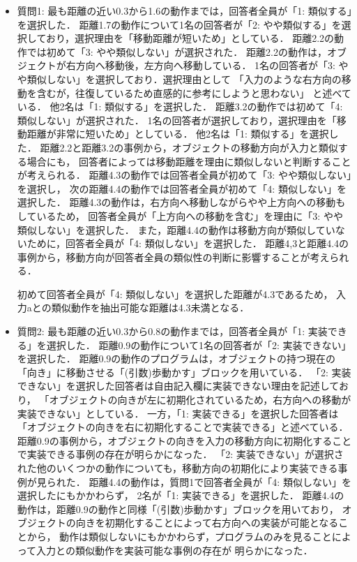 \documentclass[11pt]{jreport}
\begin{document}
\begin{itemize}
    \item 質問1: 最も距離の近い0.3から1.6の動作までは，回答者全員が「1: 類似する」を選択した．
    距離1.7の動作について1名の回答者が「2: やや類似する」を選択しており，選択理由を「移動距離が短いため」としている．
    距離2.2の動作では初めて「3: やや類似しない」が選択された．
    距離2.2の動作は，オブジェクトが右方向へ移動後，左方向へ移動している．
    1名の回答者が「3: やや類似しない」を選択しており．選択理由として
    「入力のような右方向の移動を含むが，往復しているため直感的に参考にしようと思わない」
    と述べている．
    他2名は「1: 類似する」を選択した．
    距離3.2の動作では初めて「4: 類似しない」が選択された．
    1名の回答者が選択しており，選択理由を「移動距離が非常に短いため」としている．
    他2名は「1: 類似する」を選択した．
    距離2.2と距離3.2の事例から，オブジェクトの移動方向が入力と類似する場合にも，
    回答者によっては移動距離を理由に類似しないと判断することが考えられる．
    距離4.3の動作では回答者全員が初めて「3: やや類似しない」を選択し，
    次の距離4.4の動作では回答者全員が初めて「4: 類似しない」を選択した．
    距離4.3の動作は，右方向へ移動しながらやや上方向への移動もしているため，
    回答者全員が「上方向への移動を含む」を理由に「3: やや類似しない」を選択した．
    また，距離4.4の動作は移動方向が類似していないために，回答者全員が「4: 類似しない」を選択した．
    距離4,3と距離4.4の事例から，移動方向が回答者全員の類似性の判断に影響することが考えられる．
    
    初めて回答者全員が「4: 類似しない」を選択した距離が4.3であるため，
    入力aとの類似動作を抽出可能な距離は4.3未満となる．
    
    \item 質問2: 最も距離の近い0.3から0.8の動作までは，回答者全員が「1: 実装できる」を選択した．
    距離0.9の動作について1名の回答者が「2: 実装できない」を選択した．
    距離0.9の動作のプログラムは，オブジェクトの持つ現在の「向き」に移動させる「(引数)歩動かす」ブロックを用いている．
    「2: 実装できない」を選択した回答者は自由記入欄に実装できない理由を記述しており，
    「オブジェクトの向きが左に初期化されているため，右方向への移動が実装できない」としている．
    一方，「1: 実装できる」を選択した回答者は「オブジェクトの向きを右に初期化することで実装できる」と述べている．
    距離0.9の事例から，オブジェクトの向きを入力の移動方向に初期化することで実装できる事例の存在が明らかになった．
    「2: 実装できない」が選択された他のいくつかの動作についても，移動方向の初期化により実装できる事例が見られた．
    距離4.4の動作は，質問1で回答者全員が「4: 類似しない」を選択したにもかかわらず，
    2名が「1: 実装できる」を選択した．
    距離4.4の動作は，距離0.9の動作と同様「(引数)歩動かす」ブロックを用いており，
    オブジェクトの向きを初期化することによって右方向への実装が可能となることから，
    動作は類似しないにもかかわらず，プログラムのみを見ることによって入力との類似動作を実装可能な事例の存在が
    明らかになった．
\end{itemize}
\end{document}
